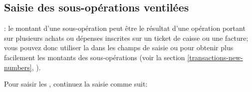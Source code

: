 \subsection{Saisie des sous-opérations ventilées\label{transactions-breakdown-slave}}

\Note{}: le montant d'une sous-opération peut être le résultat d'une opération portant sur plusieurs achats ou dépenses inscrites sur un ticket de caisse ou une facture; vous pouvez donc utiliser la  dans les champs de saisie  ou  pour obtenir plus facilement les montants des sous-opérations (voir la section \vref{transactions-new-numbers}, ).

Pour saisir les , continuez la saisie comme suit:
